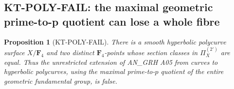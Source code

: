 \documentclass[11pt,a4paper]{article}
\newtheorem{proposition}[theorem]{Proposition}
\theoremstyle{definition}
\begin{document}


\subsection{KT-POLY-FAIL: the maximal geometric prime-to-p quotient
can lose a whole fibre}
\label{sec:kt-poly-fail}

\begin{proposition}[KT-POLY-FAIL]
There is a smooth hyperbolic polycurve surface $X/\mathbf F_4$
and two distinct $\mathbf F_4$-points whose section classes in
$\Pi_X^{(2')}$ are equal. Thus the unrestricted extension of
AN\_GRH A05 from curves to hyperbolic polycurves, using the
maximal prime-to-$p$ quotient of the entire geometric fundamental
group, is false.
\end{proposition}
\end{document}
